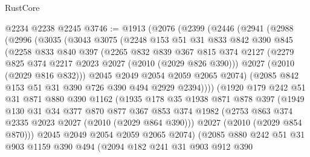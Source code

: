 \begin{lexlean}{RustCore}
\begin{coremodule}
    @2234
    @2238
    @2245
@3746 := @1913
    (@2076
      (@2399
        (@2446
          (@2941
            (@2988
              (@2996
                (@3035
                  (@3043
                    @3075
                    (@2248
                      @153
                      @51
                      @31
                      @833
                      @842
                      @390
                      @845
                      (@2258
                        @833
                        @840
                        @397
                        (@2265
                          @832
                          @839
                          @367
                          @815
                          @374
                          @2127
                          (@2279 @825 @374 @2217 @2023 @2027 (@2010 (@2029 @826 @390)))
                          @2027
                          (@2010 (@2029 @816 @832)))
                        @2045
                        @2049
                        @2054
                        @2059
                        @2065
                        @2074)
                      (@2085 @842 @153 @51 @31 @390 @726 @390 @494 @2929 @2394))))
                (@1920
                  @179
                  @242
                  @51
                  @31
                  @871
                  @880
                  @390
                  @1162
                  (@1935
                    @178
                    @35
                    @1938
                    @871
                    @878
                    @397
                    (@1949
                      @130
                      @31
                      @34
                      @377
                      @870
                      @877
                      @367
                      @853
                      @374
                      @1982
                      (@2753 @863 @374 @2335 @2023 @2027 (@2010 (@2029 @864 @390)))
                      @2027
                      (@2010 (@2029 @854 @870)))
                    @2045
                    @2049
                    @2054
                    @2059
                    @2065
                    @2074)
                  (@2085
                    @880
                    @242
                    @51
                    @31
                    @903
                    @1159
                    @390
                    @494
                    (@2094
                      @182
                      @241
                      @31
                      @903
                      @912
                      @390

\end{coremodule}
\end{lexlean}
